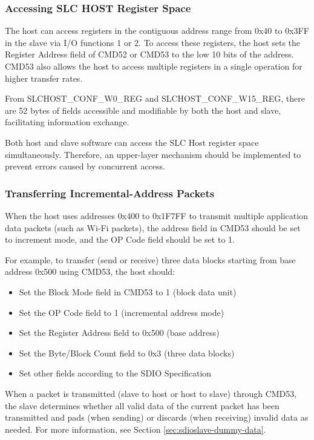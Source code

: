 \documentclass[main\_\_EN.tex]{subfiles}
\begin{document}
\subsubsection{Accessing SLC HOST Register Space}

The host can access registers in the contiguous address range from 0x40 to 0x3FF in the slave via I/O functions 1 or 2. To access these registers, the host sets the Register Address field of CMD52 or CMD53 to the low 10 bits of the address. CMD53 also allows the host to access multiple registers in a single operation for higher transfer rates.

From SLCHOST\_CONF\_W0\_REG and SLCHOST\_CONF\_W15\_REG, there are 52 bytes of fields accessible and modifiable by both the host and slave, facilitating information exchange.

Both host and slave software can access the SLC Host register space simultaneously. Therefore, an upper-layer mechanism should be implemented to prevent errors caused by concurrent access.

\subsubsection{Transferring Incremental-Address Packets}

When the host uses addresses 0x400 to 0x1F7FF to transmit multiple application data packets (such as Wi-Fi packets), the address field in CMD53 should be set to increment mode, and the OP Code field should be set to 1.

For example, to transfer (send or receive) three data blocks starting from base address 0x500 using CMD53, the host should:

\begin{itemize}
    \item Set the Block Mode field in CMD53 to 1 (block data unit)
    \item Set the OP Code field to 1 (incremental address mode)
    \item Set the Register Address field to 0x500 (base address)
    \item Set the Byte/Block Count field to 0x3 (three data blocks)
    \item Set other fields according to the SDIO Specification
\end{itemize}

When a packet is transmitted (slave to host or host to slave) through CMD53, the slave determines whether all valid data of the current packet has been transmitted and pads (when sending) or discards (when receiving) invalid data as needed. For more information, see Section \ref{sec:sdioslave-dummy-data}.
\end{document}
